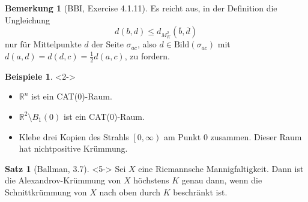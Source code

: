 \documentclass{beamer}
\newcommand{\R}{\mathbb{R}} %
\newcommand{\Bild}{\mathrm{Bild}} %
\theoremstyle{definition}
\newtheorem*{bspe}{Beispiele}
\newtheorem*{satz}{Satz}
\newtheorem*{bem}{Bemerkung}
\begin{document}
\begin{frame}
  \begin{bem}[BBI, Exercise 4.1.11]
    Es reicht aus, in der Definition die Ungleichung
    \[ d(b, d) \leq d_{M_K^2}(\overline{b}, \overline{d}) \]
    nur für Mittelpunkte $d$ der Seite $\sigma_{ac}$, also $d \in \Bild(\sigma_{ac})$ mit $d(a, d) = d(d, c) = \tfrac{1}{2} d(a, c)$, zu fordern.
  \end{bem}

  \begin{bspe}<2->
    \begin{itemize}
      \item<2-> $\R^n$ ist ein CAT(0)-Raum.
      \item<3-> $\R^2 \setminus B_1(0)$ ist ein CAT(0)-Raum.
      \item<4-> Klebe drei Kopien des Strahls $\left[0,\infty\right)$ am Punkt $0$ zusammen. Dieser Raum hat nichtpositive Krümmung.
    \end{itemize}
  \end{bspe}

  \begin{satz}[Ballman, 3.7]<5->
    Sei $X$ eine Riemannsche Mannigfaltigkeit. Dann ist die Alexandrov-Krümmung von $X$ höchstens $K$ genau dann, wenn die Schnittkrümmung von $X$ nach oben durch $K$ beschränkt ist.
  \end{satz}
\end{frame}
\end{document}
